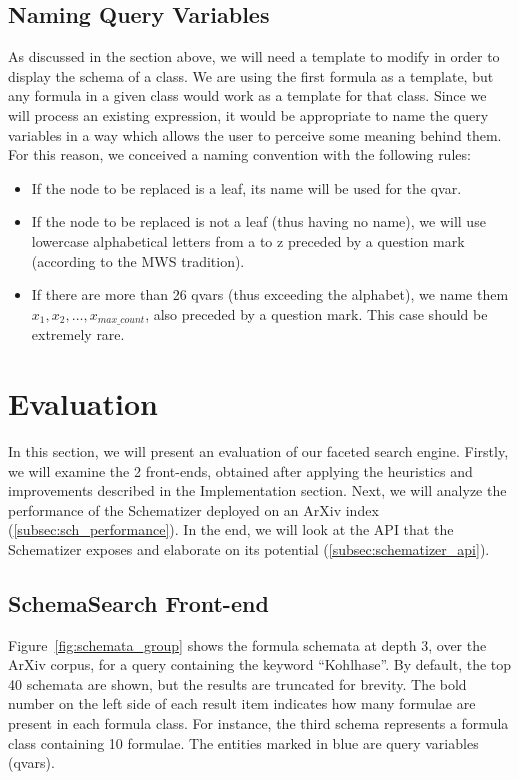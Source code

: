 \documentclass[a4paper,oneside]{article}
\def\MWS{\textsf{MWS}\xspace}
\def\arxiv{\textsf{ArXiv}\xspace}
\begin{document}
\subsection{Naming Query Variables}\label{subsec:naming_qvars}
As discussed in the section above, we will need a template to modify in order
to display the schema of a class. We are using the first formula as a template,
but any formula in a given class would work as a template for that class.
Since we will process an existing expression, it would be appropriate to name
the query variables in a way which allows the user to perceive some meaning
behind them. For this reason, we conceived a naming convention with the
following rules:

\begin{itemize}
    \item If the node to be replaced is a leaf, its name will be used for the
        qvar.
    \item If the node to be replaced is not a leaf (thus having no name), we
        will use lowercase alphabetical letters from \textsf{a} to \textsf{z}
        preceded by a question mark (according to the \MWS tradition).
    \item If there are more than 26 qvars (thus exceeding the alphabet), we
        name them $x_{1}, x_{2}, \ldots, x_{max\_count}$, also preceded by a
        question mark. This case should be extremely rare.
\end{itemize}

\section{Evaluation}\label{sec:evaluation}

In this section, we will present an evaluation of our faceted search engine.
Firstly, we will examine the 2 front-ends, obtained after applying the
heuristics and improvements described in the Implementation section. Next, we
will analyze the performance of the Schematizer deployed on an \arxiv index
(\ref{subsec:sch_performance}). In the end, we will look at the API that the
Schematizer exposes and elaborate on its potential
(\ref{subsec:schematizer_api}).

\subsection{SchemaSearch Front-end}\label{subsec:fe_results_display1}
Figure~\ref{fig:schemata_group} shows the formula schemata at depth 3, over the
\arxiv corpus, for a query containing the keyword ``Kohlhase''. By default, the
top 40 schemata are shown, but the results are truncated for brevity.  The bold
number on the left side of each result item indicates how many formulae are
present in each formula class. For instance, the third schema represents a
formula class containing 10 formulae. The entities marked in blue are query
variables (qvars).
\end{document}

